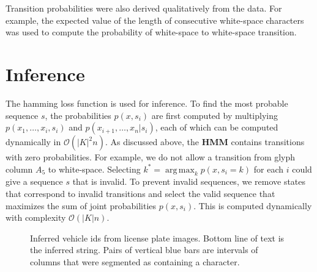 \documentclass[a4paper,12pt]{article}
\DeclareMathOperator*{\argmax}{arg\,max}
\begin{document}
Transition probabilities were also derived qualitatively from the
data. For example, the expected value of the length of consecutive
white-space characters was used to compute the probability of
white-space to white-space transition.

\section{Inference}
The hamming loss function is used for inference.  To find the most
probable sequence $s$, the probabilities $p(x,s_i)$ are first computed
by multiplying $p(x_1,\ldots,x_i,s_i)$ and
$p(x_{i+1},\ldots,x_n|s_i)$, each of which can be computed dynamically
in $\mathcal{O}(|K|^2n)$. As discussed above, the \textbf{HMM}
contains transitions with zero probabilities. For example, we do not
allow a transition from glyph column $A_5$ to white-space. Selecting
$k^*=\argmax_k{p(x,s_i=k)}$ for each $i$ could give a sequence $s$
that is invalid. To prevent invalid sequences, we remove states that
correspond to invalid transitions and select the valid sequence that
maximizes the sum of joint probabilities $p(x,s_i)$. This is computed
dynamically with complexity $\mathcal{O}(|K|n)$.

\begin{figure}[h]
  \centering
  \caption{Inferred vehicle ids from license plate images. Bottom
    line of text is the inferred string. Pairs of vertical blue bars
    are intervals of columns that were segmented as containing a
    character.}
  \label{fig:inferred-strings}
\end{figure}
\end{document}
